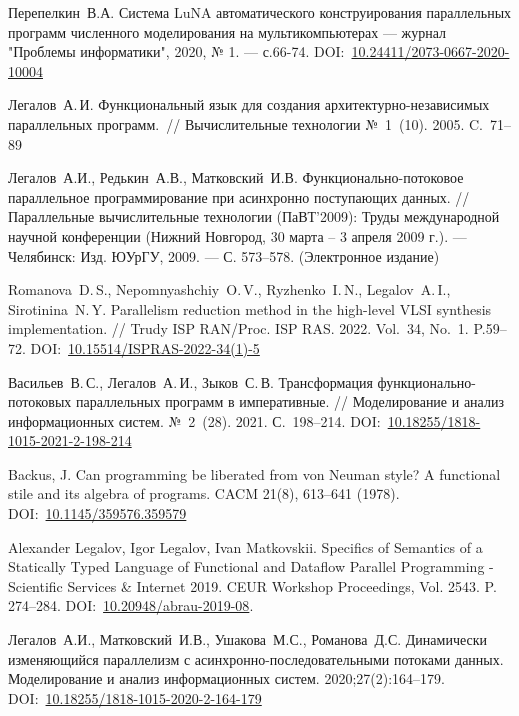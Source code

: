 \begin{thebibliography}{00}
Перепелкин~В.А.
Система LuNA автоматического конструирования параллельных программ численного моделирования на мультикомпьютерах --- журнал "Проблемы информатики", 2020, № 1. --- с.66-74.
DOI:~\href{https://doi.org/10.24411/2073-0667-2020-10004}{10.24411/2073-0667-2020-10004}

Легалов~А.\,И. Функциональный язык для создания архитектурно-независимых параллельных программ.~//
Вычислительные технологии №~1~(10). 2005. C.~71--89

Легалов~А.И., Редькин~А.В., Матковский~И.В. Функционально-потоковое параллельное программирование при асинхронно поступающих данных. // Па\-рал\-лель\-ные вычислительные технологии (ПаВТ'2009): Труды международной научной конференции (Нижний Новгород, 30 марта – 3 апреля 2009 г.).
--- Че\-ля\-бинск: Изд. ЮУрГУ, 2009. --- С. 573--578. (Электронное издание)

Romanova~D.\,S., Nepomnyashchiy~O.\,V., Ryzhenko~I.\,N., Legalov~A.\,I., Sirotinina~N.\,Y. Parallelism reduction method in the high-level VLSI synthesis implementation. // Trudy ISP RAN/Proc. ISP RAS. 2022. Vol.~34, No.~1. P.59--72. DOI:~\href{https://doi.org/10.15514/ISPRAS-2022-34(1)-5}{10.15514/ISPRAS-2022-34(1)-5}

Васильев~В.\,С., Легалов~А.\,И., Зыков~С.\,В. Трансформация функционально-потоковых параллельных программ в императивные. // Моделирование и анализ информационных систем. №~2~(28). 2021. С.~198--214. DOI:~\href{https://doi.org/10.18255/1818-1015-2021-2-198-214}{10.18255/1818-1015-2021-2-198-214}

Backus, J.
Can programming be liberated from von Neuman style? A functional
stile and its algebra of programs. CACM 21(8), 613–641 (1978). DOI:~\href{https://doi.org/10.1145/359576.359579}{10.1145/359576.359579}

Alexander Legalov, Igor Legalov, Ivan Matkovskii. Specifics of Semantics of a Statically Typed Language of Functional and Dataflow Parallel Programming - Scientific Services \& Internet 2019.  CEUR Workshop Proceedings, Vol. 2543. P. 274--284. DOI:~\href{https://doi.org/10.20948/abrau-2019-08}{10.20948/abrau-2019-08}.

Легалов~А.И., Матковский~И.В., Ушакова~М.С., Романова~Д.С. Динамически изменяющийся параллелизм с асинхронно-последовательными потоками данных. Моделирование и анализ информационных систем. 2020;27(2):164--179.  DOI:~\href{https://doi.org/10.18255/1818-1015-2020-2-164-179}{10.18255/1818-1015-2020-2-164-179}


\end{thebibliography}

